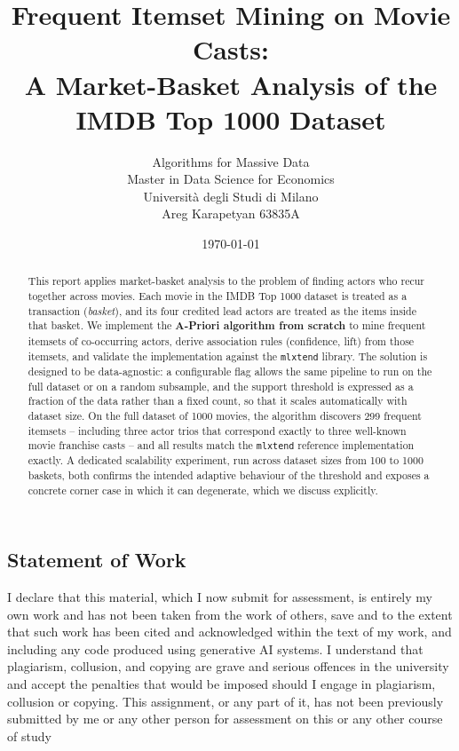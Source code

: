 \documentclass[11pt,a4paper]{article}
\title{Frequent Itemset Mining on Movie Casts: \\
A Market-Basket Analysis of the IMDB Top 1000 Dataset}
\author{Algorithms for Massive Data \\ Master in Data Science for Economics \\ Universit\`a degli Studi di Milano \\ Areg Karapetyan 63835A}
\date{\today}
\begin{document}
\sloppy

\maketitle

\begin{abstract}
This report applies market-basket analysis to the problem of finding actors who
recur together across movies. Each movie in the IMDB Top 1000 dataset is treated
as a transaction (\emph{basket}), and its four credited lead actors are treated
as the items inside that basket. We implement the \textbf{A-Priori algorithm
from scratch} to mine frequent itemsets of co-occurring actors, derive
association rules (confidence, lift) from those itemsets, and validate the
implementation against the \texttt{mlxtend} library. The solution is designed
to be data-agnostic: a configurable
flag allows the same pipeline to run on the full dataset or on a random
subsample, and the support threshold is expressed as a fraction of the data
rather than a fixed count, so that it scales automatically with dataset size.
On the full dataset of 1000 movies, the algorithm discovers 299 frequent
itemsets -- including three actor trios that correspond exactly to three
well-known movie franchise casts -- and all results match the \texttt{mlxtend}
reference implementation exactly. A dedicated scalability experiment, run
across dataset sizes from 100 to 1000 baskets, both confirms the intended
adaptive behaviour of the threshold and exposes a concrete corner case in which
it can degenerate, which we discuss explicitly.
\end{abstract}

\subsection*{Statement of Work}

I declare that this material, which I now submit for assessment, is entirely my own work
and has not been taken from the work of others, save and to the extent that such work has
been cited and acknowledged within the text of my work, and including any code produced
using generative AI systems. I understand that plagiarism, collusion, and copying are grave
and serious offences in the university and accept the penalties that would be imposed should
I engage in plagiarism, collusion or copying. This assignment, or any part of it, has not
been previously submitted by me or any other person for assessment on this or any other
course of study
\end{document}
